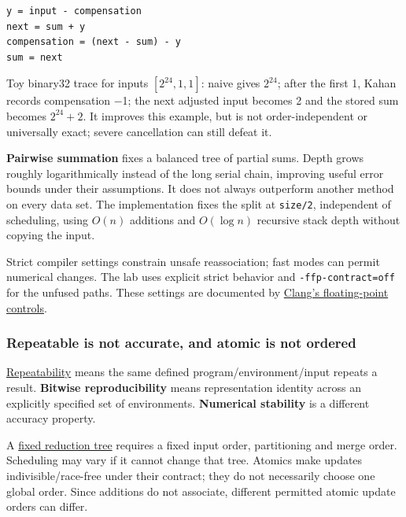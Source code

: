 \begin{verbatim}
y = input - compensation
next = sum + y
compensation = (next - sum) - y
sum = next
\end{verbatim}

Toy binary32 trace for inputs \([2^{24},1,1]\): naive gives \(2^{24}\); after the first 1, Kahan records compensation −1; the next adjusted input becomes 2 and the stored sum becomes \(2^{24}+2\). It improves this example, but is not order-independent or universally exact; severe cancellation can still defeat it.

\textbf{Pairwise summation} fixes a balanced tree of partial sums. Depth grows roughly logarithmically instead of the long serial chain, improving useful error bounds under their assumptions. It does not always outperform another method on every data set. The implementation fixes the split at \texttt{size/2}, independent of scheduling, using \(O(n)\) additions and \(O(\log n)\) recursive stack depth without copying the input.

Strict compiler settings constrain unsafe reassociation; fast modes can permit numerical changes. The lab uses explicit strict behavior and \texttt{-ffp-contract=off} for the unfused paths. These settings are documented by \href{https://clang.llvm.org/docs/UsersManual.html\#controlling-floating-point-behavior}{Clang's floating-point controls}.

\subsubsection{Repeatable is not accurate, and atomic is not ordered}\label{01-foundations-i-ch001-repeatable-is-not-accurate-and-atomic-is-not-ordered}

\hypertarget{01-foundations-i-ch001-repeatable-is-not-accurate-and-atomic-is-not-ordered}{}

\hyperref[appendix-5f1a2c3f97ff]{Repeatability} means the same defined program/environment/input repeats a result. \textbf{Bitwise reproducibility} means representation identity across an explicitly specified set of environments. \textbf{Numerical stability} is a different accuracy property.

A \hyperref[appendix-4c8e0238e7ee]{fixed reduction tree} requires a fixed input order, partitioning and merge order. Scheduling may vary if it cannot change that tree. Atomics make updates indivisible/race-free under their contract; they do not necessarily choose one global order. Since additions do not associate, different permitted atomic update orders can differ.

